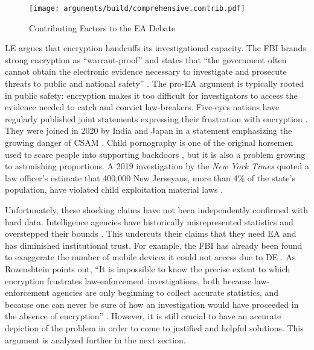 \documentclass{IEEEtran}
\begin{document}
\begin{sidewaysfigure*}
  \centering
  \texttt{[image: arguments/build/comprehensive.contrib.pdf]}
  \caption{Contributing Factors to the EA Debate}
  \label{fig-args-contrib}
\end{sidewaysfigure*}

\Acl{LE} argues that encryption handcuffs its investigational capacity. The \ac{FBI} brands strong encryption as
``warrant-proof'' and states that ``the government often cannot obtain the electronic evidence necessary to investigate
and prosecute threats to public and national safety'' \cite{fbi_2020}. The pro-\ac{EA} argument is typically rooted in
public safety: encryption makes it too difficult for investigators to access the evidence needed to catch and convict
law-breakers. Five-eyes nations have regularly published joint statements expressing their frustration with encryption
\cite{ministerial_2018} \cite{goodale_2017}. They were joined in 2020 by India and Japan in a statement emphasizing the
growing danger of \ac{CSAM} \cite{intl_2020}. Child pornography is one of the original \ac{horsemen} used to scare
people into supporting backdoors \cite{schneier_scaring_2019}, but it is also a problem growing to astonishing
proportions. A 2019 investigation by the \textit{New York Times} quoted a law officer's estimate that 400,000 New
Jerseyans, more than 4\% of the state's population, have violated child exploitation material laws
\cite{keller_internet_2019}.

Unfortunately, these shocking claims have not been independently confirmed with hard data. Intelligence agencies have
historically misrepresented statistics and overstepped their bounds \cite{johnson_congressional_2004}
\cite{shamsi_2011}. This undercuts their claims that they need \ac{EA} and has diminished institutional trust. For
example, the \ac{FBI} has already been found to exaggerate the number of mobile devices it could not access due to
\acl{DE} \cite{devlin_2018}. As Rozenshtein points out, ``It is impossible to know the precise extent to which
encryption frustrates law-enforcement investigations, both because law-enforcement agencies are only beginning to
collect accurate statistics, and because one can never be sure of how an investigation would have proceeded in the
absence of encryption'' \cite{rozenshtein_wicked_2018}. However, it is still crucial to have an accurate depiction of
the problem in order to come to justified and helpful solutions. This argument is analyzed further in the next section.
\end{document}
